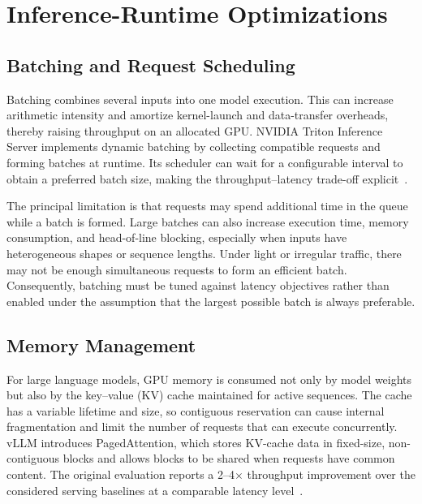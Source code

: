 \section{Inference-Runtime Optimizations}
\label{sec:sota-runtime-level}

\subsection{Batching and Request Scheduling}
\label{subsec:sota-batching}

Batching combines several inputs into one model execution. This can increase arithmetic intensity and amortize kernel-launch and data-transfer overheads, thereby raising throughput on an allocated GPU. NVIDIA Triton Inference Server implements dynamic batching by collecting compatible requests and forming batches at runtime. Its scheduler can wait for a configurable interval to obtain a preferred batch size, making the throughput--latency trade-off explicit~\cite{nvidia2026tritonbatching}.

The principal limitation is that requests may spend additional time in the queue while a batch is formed. Large batches can also increase execution time, memory consumption, and head-of-line blocking, especially when inputs have heterogeneous shapes or sequence lengths. Under light or irregular traffic, there may not be enough simultaneous requests to form an efficient batch. Consequently, batching must be tuned against latency objectives rather than enabled under the assumption that the largest possible batch is always preferable.

\subsection{Memory Management}
\label{subsec:sota-memory-management}

For large language models, GPU memory is consumed not only by model weights but also by the key--value (KV) cache maintained for active sequences. The cache has a variable lifetime and size, so contiguous reservation can cause internal fragmentation and limit the number of requests that can execute concurrently. vLLM introduces PagedAttention, which stores KV-cache data in fixed-size, non-contiguous blocks and allows blocks to be shared when requests have common content. The original evaluation reports a 2--4$\times$ throughput improvement over the considered serving baselines at a comparable latency level~\cite{kwon2023pagedattention}.

